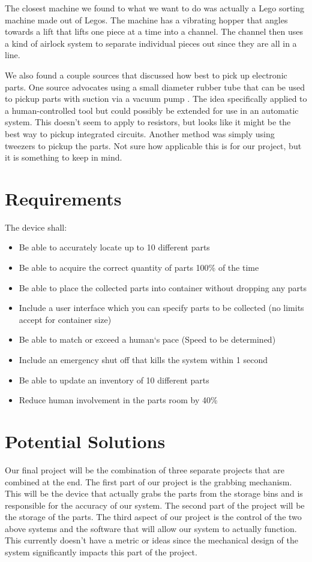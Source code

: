 \documentclass[12pt]{report}
\begin{document}
The closest machine we found to what we want to do was actually a Lego sorting machine made out of Legos. The machine has a vibrating hopper that angles towards a lift that lifts one piece at a time into a channel. The channel then uses a kind of airlock system to separate individual pieces out since they are all in a line\cite{legoSorter}.


We also found a couple sources that discussed how best to pick up electronic parts. One source advocates using a small diameter rubber tube that can be used to pickup parts with suction via a vacuum pump \cite{vacuumPick}. The idea specifically applied to a human-controlled tool but could possibly be extended for use in an automatic system. This doesn't seem to apply to resistors, but looks like it might be the best way to pickup integrated circuits. Another method was simply using tweezers to pickup the parts. Not sure how applicable this is for our project, but it is something to keep in mind.

\section*{Requirements}


\noindent The device shall: \\
\begin{itemize}
\item Be able to accurately locate up to 10 different parts
\item Be able to acquire the correct quantity of parts 100\% of the time
\item Be able to place the collected parts into container without dropping any parts
\item Include a user interface which you can specify parts to be collected (no limits accept for container size)
\item Be able to match or exceed a human`s pace (Speed to be determined)
\item Include an emergency shut off that kills the system within 1 second
\item Be able to update an inventory of 10 different parts
\item Reduce human involvement in the parts room by 40\%
\end{itemize}

\section*{Potential Solutions}
Our final project will be the combination of three separate projects that are combined at the end. The first part of our project is the grabbing mechanism. This will be the device that actually grabs the parts from the storage bins and is responsible for the accuracy of our system. The second part of the project will be the storage of the parts. The third aspect of our project is the control of the two above systems and the software that will allow our system to actually function. This currently doesn't have a metric or ideas since the mechanical design of the system significantly impacts this part of the project.
\end{document}
